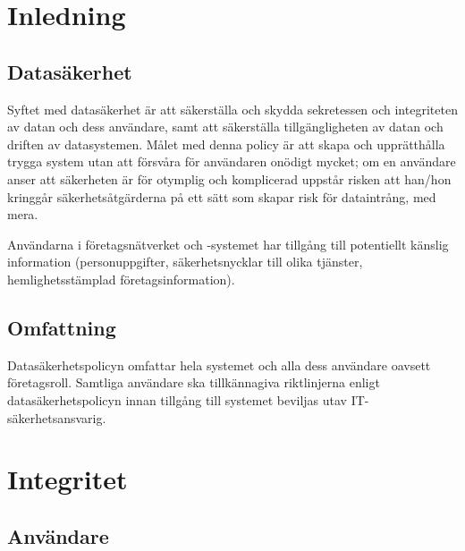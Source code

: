 \documentclass[a4paper,12pt]{article}
\title{\articlename}
\author{\authorname}
\begin{document}
\maketitle
{}
\thispagestyle{empty}
\clearpage

\tableofcontents
\clearpage


\section{Inledning}

\subsection{Datasäkerhet}

Syftet med datasäkerhet är att säkerställa och skydda sekretessen och integriteten av datan och dess användare, samt att säkerställa tillgängligheten av datan och  driften av datasystemen. Målet med denna policy är att skapa och upprätthålla trygga system utan att försvåra för användaren onödigt mycket; om en användare anser att säkerheten är för otymplig och komplicerad uppstår risken att han/hon kringgår säkerhetsåtgärderna på ett sätt som skapar risk för dataintrång, med mera.

Användarna i företagsnätverket och -systemet har tillgång till potentiellt känslig information (personuppgifter, säkerhetsnycklar till olika tjänster, hemlighetsstämplad företagsinformation).

\subsection{Omfattning}

Datasäkerhetspolicyn omfattar hela systemet och alla dess användare oavsett företagsroll. Samtliga användare ska tillkännagiva riktlinjerna enligt datasäkerhetspolicyn innan tillgång till systemet beviljas utav IT-säkerhetsansvarig.


\clearpage

\section{Integritet}

\subsection{Användare}
\end{document}
